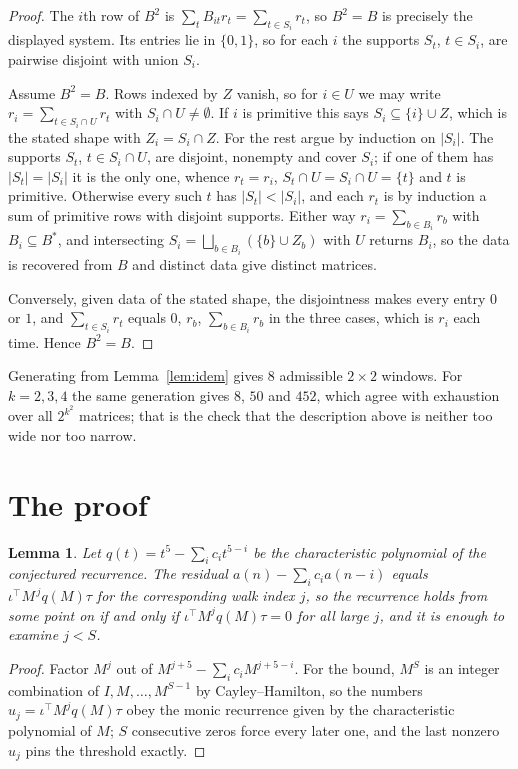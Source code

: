\documentclass[11pt,a4paper]{article}
\theoremstyle{plain}
\newtheorem{lemma}[theorem]{Lemma}
\theoremstyle{definition}
\begin{document}
\begin{proof}
The $i$th row of $B^2$ is $\sum_t B_{it}r_t=\sum_{t\in S_i}r_t$, so $B^2=B$ is precisely the
displayed system. Its entries lie in $\{0,1\}$, so for each $i$ the supports $S_t$,
$t\in S_i$, are pairwise disjoint with union $S_i$.

Assume $B^2=B$. Rows indexed by $Z$ vanish, so for $i\in U$ we may write
$r_i=\sum_{t\in S_i\cap U}r_t$ with $S_i\cap U\neq\emptyset$. If $i$ is primitive this says
$S_i\subseteq\{i\}\cup Z$, which is the stated shape with $Z_i=S_i\cap Z$. For the rest argue
by induction on $|S_i|$. The supports $S_t$, $t\in S_i\cap U$, are disjoint, nonempty and
cover $S_i$; if one of them has $|S_t|=|S_i|$ it is the only one, whence $r_t=r_i$,
$S_t\cap U=S_i\cap U=\{t\}$ and $t$ is primitive. Otherwise every such $t$ has
$|S_t|<|S_i|$, and each $r_t$ is by induction a sum of primitive rows with disjoint supports.
Either way $r_i=\sum_{b\in B_i}r_b$ with $B_i\subseteq B^{\ast}$, and intersecting
$S_i=\bigsqcup_{b\in B_i}(\{b\}\cup Z_b)$ with $U$ returns $B_i$, so the data is recovered
from $B$ and distinct data give distinct matrices.

Conversely, given data of the stated shape, the disjointness makes every entry $0$ or $1$, and
$\sum_{t\in S_i}r_t$ equals $0$, $r_b$, $\sum_{b\in B_i}r_b$ in the three cases, which is
$r_i$ each time. Hence $B^2=B$.
\end{proof}

Generating from Lemma~\ref{lem:idem} gives $8$ admissible $2\times2$ windows. For
$k=2,3,4$ the same generation gives $8$, $50$ and $452$, which agree with exhaustion over all
$2^{k^2}$ matrices; that is the check that the description above is neither too wide nor too
narrow.

\section{The proof}

\begin{lemma}\label{lem:crit}
Let $q(t)=t^{5}-\sum_i c_it^{5-i}$ be the characteristic polynomial of the
conjectured recurrence. The residual $a(n)-\sum_ic_ia(n-i)$ equals
$\iota^{\!\top}M^{\,j}q(M)\tau$ for the corresponding walk index $j$, so the recurrence
holds from some point on if and only if $\iota^{\!\top}M^{j}q(M)\tau=0$ for all large $j$,
and it is enough to examine $j<S$.
\end{lemma}

\begin{proof}
Factor $M^{j}$ out of $M^{j+5}-\sum_ic_iM^{j+5-i}$. For the bound, $M^{S}$
is an integer combination of $I,M,\dots,M^{S-1}$ by Cayley--Hamilton, so the numbers
$u_j=\iota^{\!\top}M^{j}q(M)\tau$ obey the monic recurrence given by the characteristic
polynomial of $M$; $S$ consecutive zeros force every later one, and the last nonzero $u_j$
pins the threshold exactly.
\end{proof}
\end{document}
